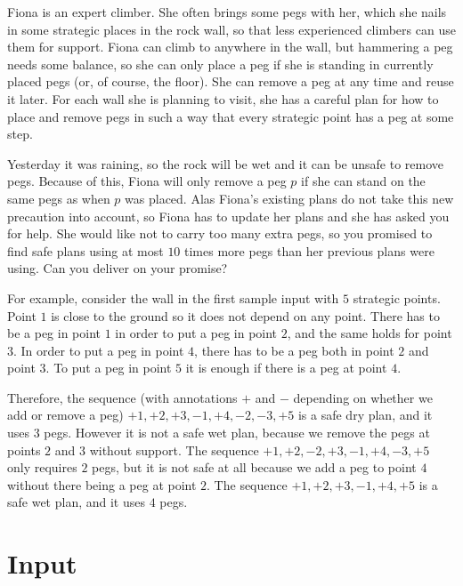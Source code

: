 

Fiona is an expert climber. She often brings some pegs with her, which
she nails in some strategic places in the rock wall, so that less
experienced climbers can use them for support. Fiona can climb to
anywhere in the wall, but hammering a peg needs some balance, so she
can only place a peg if she is standing in currently placed pegs (or,
of course, the floor). She can remove a peg at any time and reuse it
later. For each wall she is planning to visit, she has a careful plan
for how to place and remove pegs in such a way that every strategic
point has a peg at some step.

Yesterday it was raining, so the rock will be wet and it can be unsafe
to remove pegs.  Because of this, Fiona will only remove a peg $p$ if
she can stand on the same pegs as when $p$ was placed.  Alas Fiona's
existing plans do not take this new precaution into account, so Fiona
has to update her plans and she has asked you for help. She would like
not to carry too many extra pegs, so you promised to find safe plans
using at most $10$ times more pegs than her previous plans were
using. Can you deliver on your promise?

For example, consider the wall in the first sample input with $5$
strategic points. Point $1$ is close to the ground so it does not
depend on any point. There has to be a peg in point $1$ in order to
put a peg in point $2$, and the same holds for point $3$. In order to
put a peg in point $4$, there has to be a peg both in point $2$ and
point $3$. To put a peg in point $5$ it is enough if there is a peg at
point $4$.

Therefore, the sequence (with annotations $+$ and $-$ depending on
whether we add or remove a peg) $+1,+2,+3,-1,+4,-2,-3,+5$ is a safe
dry plan, and it uses $3$ pegs. However it is not a safe wet plan,
because we remove the pegs at points $2$ and $3$ without support. The
sequence $+1,+2,-2,+3,-1,+4,-3,+5$ only requires $2$ pegs, but it is
not safe at all because we add a peg to point $4$ without there being
a peg at point $2$. The sequence $+1,+2,+3,-1,+4,+5$ is a safe wet
plan, and it uses $4$ pegs.

\section*{Input}

